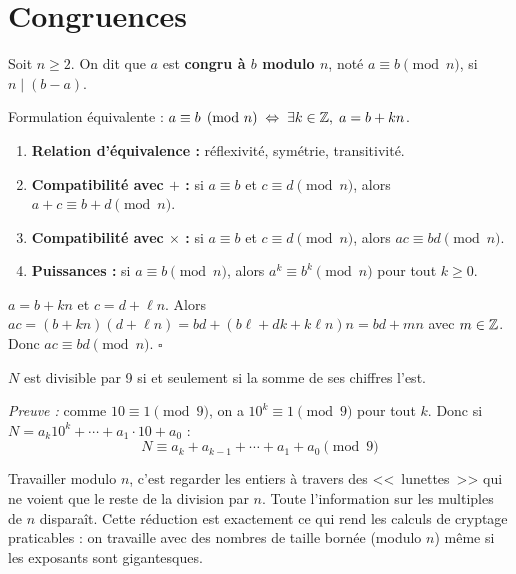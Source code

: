 \section{Congruences}

\begin{defbox}[--- Congruence]
Soit $n \geqslant 2$. On dit que $a$ est \textbf{congru à $b$ modulo $n$}, noté $a \equiv b \pmod{n}$, si $n \mid (b - a)$.

Formulation équivalente : $a \equiv b \pmod{n} \;\Leftrightarrow\; \exists k \in \mathbb{Z},\; a = b + kn$.
\end{defbox}

\begin{propbox}
\begin{enumerate}[leftmargin=1.5cm]
  \item \textbf{Relation d'équivalence :} réflexivité, symétrie, transitivité.
  \item \textbf{Compatibilité avec $+$ :} si $a \equiv b$ et $c \equiv d \pmod{n}$, alors $a + c \equiv b + d \pmod{n}$.
  \item \textbf{Compatibilité avec $\times$ :} si $a \equiv b$ et $c \equiv d \pmod{n}$, alors $ac \equiv bd \pmod{n}$.
  \item \textbf{Puissances :} si $a \equiv b \pmod{n}$, alors $a^k \equiv b^k \pmod{n}$ pour tout $k \geqslant 0$.
\end{enumerate}
\end{propbox}

\begin{proofbox}
$a = b + kn$ et $c = d + \ell n$. Alors $ac = (b + kn)(d + \ell n) = bd + (b\ell + dk + k\ell n)n = bd + mn$ avec $m \in \mathbb{Z}$. Donc $ac \equiv bd \pmod{n}$. \hfill$\square$
\end{proofbox}

\begin{exbox}
$N$ est divisible par 9 si et seulement si la somme de ses chiffres l'est.

\textit{Preuve :} comme $10 \equiv 1 \pmod{9}$, on a $10^k \equiv 1 \pmod{9}$ pour tout $k$. Donc si $N = a_k 10^k + \cdots + a_1 \cdot 10 + a_0$ :
\[
  N \equiv a_k + a_{k-1} + \cdots + a_1 + a_0 \pmod{9}
\]
\end{exbox}

\begin{intuitionbox}
Travailler modulo $n$, c'est regarder les entiers à travers des <<~lunettes~>> qui ne voient que le reste de la division par $n$. Toute l'information sur les multiples de $n$ disparaît. Cette réduction est exactement ce qui rend les calculs de cryptage praticables : on travaille avec des nombres de taille bornée (modulo $n$) même si les exposants sont gigantesques.
\end{intuitionbox}

